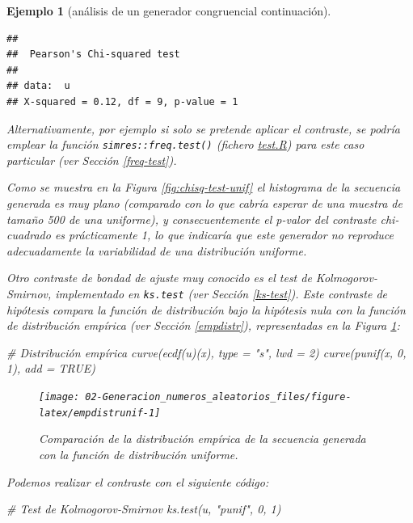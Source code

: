 \documentclass[
]{book}
\newenvironment{Shaded}{\begin{snugshade}}{\end{snugshade}}
\newcommand{\AttributeTok}[1]{\textcolor[rgb]{0.77,0.63,0.00}{#1}}
\newcommand{\CommentTok}[1]{\textcolor[rgb]{0.56,0.35,0.01}{\textit{#1}}}
\newcommand{\ConstantTok}[1]{\textcolor[rgb]{0.00,0.00,0.00}{#1}}
\newcommand{\DecValTok}[1]{\textcolor[rgb]{0.00,0.00,0.81}{#1}}
\newcommand{\FunctionTok}[1]{\textcolor[rgb]{0.00,0.00,0.00}{#1}}
\newcommand{\NormalTok}[1]{#1}
\newcommand{\StringTok}[1]{\textcolor[rgb]{0.31,0.60,0.02}{#1}}
\theoremstyle{break}
\newtheorem{example}{Ejemplo}[chapter]
\theoremstyle{nonumberplain}
\begin{document}
\begin{example}[análisis de un generador congruencial continuación]
\begin{verbatim}
## 
##  Pearson's Chi-squared test
## 
## data:  u
## X-squared = 0.12, df = 9, p-value = 1
\end{verbatim}

Alternativamente, por ejemplo si solo se pretende aplicar el contraste, se podría emplear la función \texttt{simres::freq.test()} (fichero \href{R/test.R}{\emph{test.R}}) para este caso particular (ver Sección \ref{freq-test}).

Como se muestra en la Figura \ref{fig:chisq-test-unif} el histograma de la secuencia generada es muy plano (comparado con lo que cabría esperar de una muestra de tamaño 500 de una uniforme), y consecuentemente el p-valor del contraste chi-cuadrado es prácticamente 1, lo que indicaría que este generador no reproduce adecuadamente la variabilidad de una distribución uniforme.

Otro contraste de bondad de ajuste muy conocido es el test de Kolmogorov-Smirnov, implementado en \texttt{ks.test} (ver Sección \ref{ks-test}).
Este contraste de hipótesis compara la función de distribución bajo la hipótesis nula con la función de distribución empírica (ver Sección \ref{empdistr}), representadas en la Figura \ref{fig:empdistrunif}:

\begin{Shaded}
\begin{Highlighting}[]
\CommentTok{\# Distribución empírica}
\FunctionTok{curve}\NormalTok{(}\FunctionTok{ecdf}\NormalTok{(u)(x), }\AttributeTok{type =} \StringTok{"s"}\NormalTok{, }\AttributeTok{lwd =} \DecValTok{2}\NormalTok{)}
\FunctionTok{curve}\NormalTok{(}\FunctionTok{punif}\NormalTok{(x, }\DecValTok{0}\NormalTok{, }\DecValTok{1}\NormalTok{), }\AttributeTok{add =} \ConstantTok{TRUE}\NormalTok{)}
\end{Highlighting}
\end{Shaded}

\begin{figure}[!htb]

{\centering \texttt{[image: 02-Generacion\_numeros\_aleatorios\_files/figure-latex/empdistrunif-1]} 

}

\caption{Comparación de la distribución empírica de la secuencia generada con la función de distribución uniforme.}\label{fig:empdistrunif}
\end{figure}

Podemos realizar el contraste con el siguiente código:

\begin{Shaded}
\begin{Highlighting}[]
\CommentTok{\# Test de Kolmogorov{-}Smirnov}
\FunctionTok{ks.test}\NormalTok{(u, }\StringTok{"punif"}\NormalTok{, }\DecValTok{0}\NormalTok{, }\DecValTok{1}\NormalTok{)}
\end{Highlighting}
\end{Shaded}


\end{example}
\end{document}
